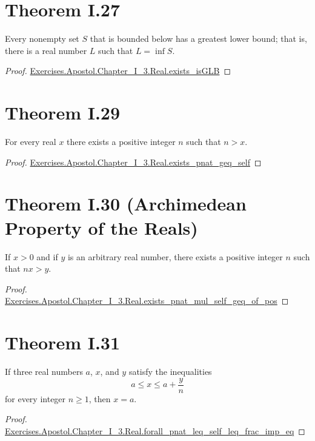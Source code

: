\documentclass{article}
\newcommand{\ns}{Exercises.Apostol.Chapter\_I\_3.Real}
\newcommand{\link}[1]{\href{../Chapter_I_3.html\#\ns.#1}{\ns.#1}}
\begin{document}
\section*{Theorem I.27}%
\label{sec:theorem-i.27}

Every nonempty set $S$ that is bounded below has a greatest lower bound; that
is, there is a real number $L$ such that $L = \inf{S}$.

\begin{proof}

  \link{exists\_isGLB}

\end{proof}

\section*{Theorem I.29}%
\label{sec:theorem-i.29}

For every real $x$ there exists a positive integer $n$ such that $n > x$.

\begin{proof}

  \link{exists\_pnat\_geq\_self}

\end{proof}

\section*{Theorem I.30 (Archimedean Property of the Reals)}%
\label{sec:theorem-i.30}

If $x > 0$ and if $y$ is an arbitrary real number, there exists a positive
integer $n$ such that $nx > y$.

\begin{proof}

  \link{exists\_pnat\_mul\_self\_geq\_of\_pos}

\end{proof}

\section*{Theorem I.31}%
\label{sec:theorem-i.31}

If three real numbers $a$, $x$, and $y$ satisfy the inequalities
$$a \leq x \leq a + \frac{y}{n}$$
for every integer $n \geq 1$, then $x = a$.

\begin{proof}

  \link{forall\_pnat\_leq\_self\_leq\_frac\_imp\_eq}

\end{proof}
\end{document}
